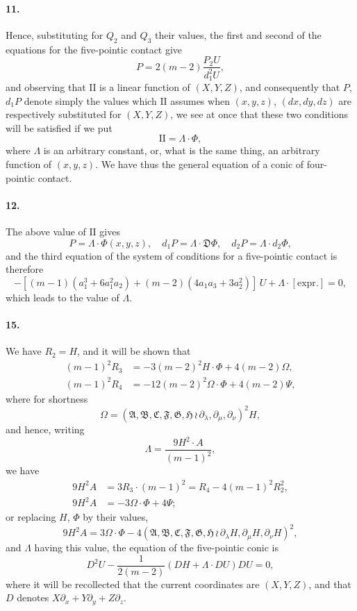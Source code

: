 \documentclass[11pt,a4paper]{book}
\begin{document}
\paragraph{11.}
Hence,  substituting   for   $Q_2$  and  $Q_3$  their  values,   the  first  and    second   of   the
equations  for  the  five-pointic  contact  give
\[
P = 2(m-2) \frac{P_2 U}{d_1^2 U},
\]
and  observing  that  $\mathrm{II}$  is  a  linear  function  of  $(X, Y, Z)$,  and  consequently  that  $P$,  $d_1 P$
denote  simply  the  values  which  $\mathrm{II}$  assumes  when  $(x, y, z)$,  $(dx, dy, dz)$  are  respectively
substituted  for  $(X, Y, Z)$,  we  see  at  once  that  these  two  conditions  will  be  satisfied  if
we  put
\[
\mathrm{II} = \Lambda \cdot \Phi,
\]
where  $\Lambda$  is  an  arbitrary  constant,  or,  what  is  the  same  thing,  an  arbitrary  function  of
$(x, y, z)$.     We  have  thus  the  general  equation  of  a  conic  of  four-pointic  contact.

\paragraph{12.}
The  above  value  of  $\mathrm{II}$  gives
\[
P = \Lambda \cdot \Phi(x, y, z), \quad d_1 P = \Lambda \cdot \mathfrak{D} \Phi, \quad d_2 P = \Lambda \cdot d_2 \Phi,
\]
and  the  third  equation  of  the  system  of  conditions  for  a  five-pointic  contact  is  therefore
\[
-[(m-1)(a_1^3 + 6a_1^2 a_2) + (m-2)(4a_1 a_3 + 3a_2^2)] \, U + \Lambda \cdot [\text{expr.}] = 0,
\]
which  leads  to  the  value  of  $\Lambda$.


\paragraph{15.}
We  have  $R_2 = H$,  and  it  will  be  shown  that
\begin{align*}
(m-1)^2 R_3 &= -3(m-2)^2 H \cdot \Phi + 4(m-2) \Omega, \\
(m-1)^2 R_4 &= -12(m-2)^2 \Omega \cdot \Phi + 4(m-2) \Psi,
\end{align*}
where  for  shortness
\[
\Omega = (\mathfrak{A}, \mathfrak{B}, \mathfrak{C}, \mathfrak{F}, \mathfrak{G}, \mathfrak{H} \,\!\!\wr\, \partial_\lambda, \partial_\mu, \partial_\nu)^2 H,
\]
and  hence,  writing
\[
\Lambda = \frac{9H^2 \cdot A}{(m-1)^2},
\]
we  have
\begin{align*}
9H^2 A &= 3R_3 \cdot (m-1)^2 = R_4 - 4(m-1)^2 R_2^2, \\
9H^2 A &= -3\Omega \cdot \Phi + 4\Psi;
\end{align*}
or  replacing  $H$,  $\Phi$  by  their  values,
\[
9H^2 A = 3\Omega \cdot \Phi - 4(\mathfrak{A}, \mathfrak{B}, \mathfrak{C}, \mathfrak{F}, \mathfrak{G}, \mathfrak{H} \,\!\!\wr\, \partial_\lambda H, \partial_\mu H, \partial_\nu H)^2,
\]
and  $\Lambda$  having  this  value,  the  equation  of  the  five-pointic  conic  is
\[
D^2 U - \frac{1}{2(m-2)} \left(DH + \Lambda \cdot DU\right) DU = 0,
\]
where  it  will  be  recollected  that  the  current  coordinates  are  $(X, Y, Z)$,  and  that  $D$
denotes  $X\partial_x + Y\partial_y + Z\partial_z$.
\end{document}
